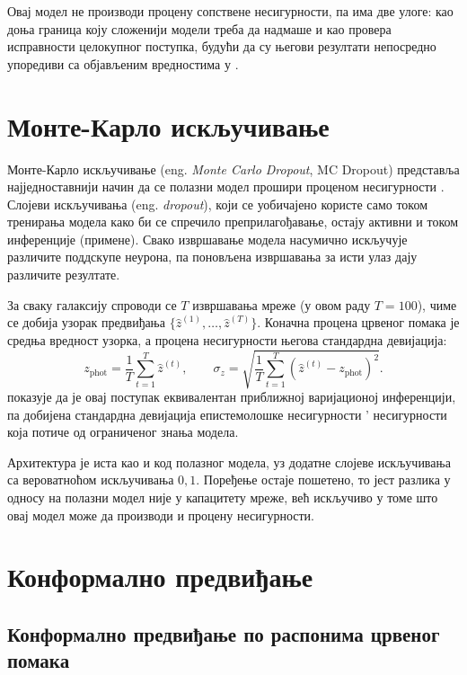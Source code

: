 \documentclass[12pt,oneside]{memoir}
\newcommand{\zphot}{z_{\mathrm{phot}}}
\newcommand{\sigz}{\sigma_z}
\begin{document}
Овај модел не производи процену сопствене несигурности, па има две улоге: 
као доња граница коју сложенији модели треба да надмаше и као провера
исправности целокупног поступка, будући да су његови резултати непосредно
упоредиви са објављеним вредностима у \cite{jones2024a}.

\section{Монте-Карло искључивање}

Монте-Карло искључивање (eng. \textit{Monte Carlo Dropout}, MC Dropout) представља најједноставнији 
начин да се полазни модел прошири проценом несигурности \cite{gal2016}. Слојеви 
искључивања (eng. \textit{dropout}), који се уобичајено користе само током тренирања модела како би 
се спречило преприлагођавање, остају активни и током инференције (примене).
Свако извршавање модела насумично искључује различите поддскупе неурона, па поновљена 
извршавања за исти улаз дају различите резултате.

За сваку галаксију спроводи се $T$ извршавања мреже (у овом раду $T = 100$), чиме се добија 
узорак предвиђања $\{\hat{z}^{(1)}, \dots, \hat{z}^{(T)}\}$. Коначна процена црвеног помака 
је средња вредност узорка, а процена несигурности његова стандардна девијација:
%
\begin{equation}
  \zphot = \frac{1}{T} \sum_{t=1}^{T} \hat{z}^{(t)} ,
  \qquad
  \sigz = \sqrt{ \frac{1}{T} \sum_{t=1}^{T}
  \left( \hat{z}^{(t)} - \zphot \right)^{2} } .
  \label{eq:mcdropout}
\end{equation}
%
\cite{gal2016} показује да је овај поступак еквивалентан приближној варијационој инференцији, 
па добијена стандардна девијација епистемолошке несигурности ’ несигурности која потиче од ограниченог знања модела.

Архитектура је иста као и код полазног модела, уз додатне слојеве искључивања са вероватноћом  искључивања $0{,}1$. 
Поређење остаје пошетено, то јест разлика у односу на полазни модел није у капацитету мреже, већ 
искључиво у томе што овај модел може да производи и процену несигурности.

\section{Конформално предвиђање}
\label{sec:cp}

\subsection{Конформално предвиђање по распонима црвеног помака}
\label{subsec:binovani-cp}
\end{document}
